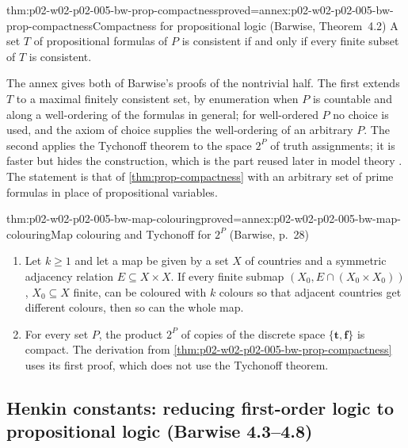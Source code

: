 \begin{hbtheorem}{thm:p02-w02-p02-005-bw-prop-compactness}{proved=annex:p02-w02-p02-005-bw-prop-compactness}{Compactness for propositional logic (Barwise, Theorem~4.2)}
A set \(T\) of propositional formulas of \(P\) is consistent if and only
if every finite subset of \(T\) is consistent.
\end{hbtheorem}

The annex gives both of Barwise's proofs of the nontrivial half.  The
first extends \(T\) to a maximal finitely consistent set, by enumeration
when \(P\) is countable and along a well-ordering of the formulas in
general; for well-ordered \(P\) no choice is used, and the axiom of choice
supplies the well-ordering of an arbitrary \(P\).  The second applies the
Tychonoff theorem to the space \(2^P\) of truth assignments; it is faster
but hides the construction, which is the part reused later in model
theory \cite[ch.~A.1, \S4, pp.~26--28]{Barwise1977FirstOrder}.  The
statement is that of \cref{thm:prop-compactness} with an arbitrary set of
prime formulas in place of propositional variables.

\begin{hbtheorem}{thm:p02-w02-p02-005-bw-map-colouring}{proved=annex:p02-w02-p02-005-bw-map-colouring}{Map colouring and Tychonoff for \(2^P\) (Barwise, p.~28)}
\begin{enumerate}
\item Let \(k\geq1\) and let a map be given by a set \(X\) of countries
      and a symmetric adjacency relation \(E\subseteq X\times X\).  If
      every finite submap \((X_0,E\cap(X_0\times X_0))\), \(X_0\subseteq X\)
      finite, can be coloured with \(k\) colours so that adjacent
      countries get different colours, then so can the whole map.
\item For every set \(P\), the product \(2^P\) of copies of the discrete
      space \(\{\mathbf t,\mathbf f\}\) is compact.  The derivation from
      \cref{thm:p02-w02-p02-005-bw-prop-compactness} uses its first proof,
      which does not use the Tychonoff theorem.
\end{enumerate}
\end{hbtheorem}

\subsection{Henkin constants: reducing first-order logic to propositional logic (Barwise 4.3--4.8)}
\label{sec:p02-w02-p02-005-bw-henkin}

